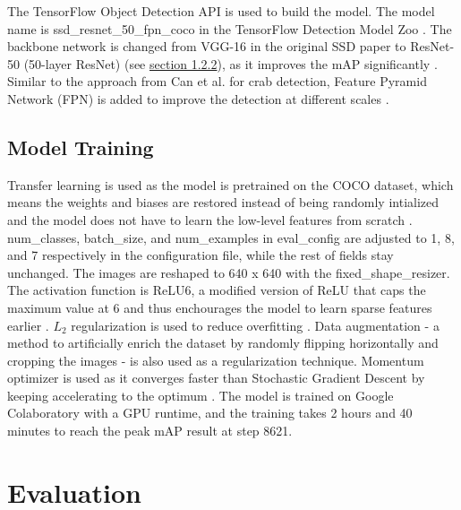 \documentclass[a4paper,11pt,oneside]{article}
\begin{document}
  The TensorFlow Object Detection API \cite{huang2017speed, tfobjectdetection} is used to build the model. The model name
  is ssd\_resnet\_50\_fpn\_coco in the TensorFlow Detection Model Zoo \cite{tfobjectdetectionmodelzoo}. The backbone
  network is changed from VGG-16 in the original SSD paper to ResNet-50 (50-layer ResNet)
  (see \hyperref[sec:122]{section 1.2.2}), as it improves the mAP significantly \cite{he2016deep}. Similar to the approach
  from Can et al. \cite{cao2020real} for crab detection, Feature Pyramid Network (FPN) is added to improve the detection at
  different scales \cite{lin2017feature}.

  \subsection{Model Training}

  Transfer learning \cite{torrey2010transfer} is used as the model is pretrained on the COCO dataset, which means the
  weights and biases are restored instead of being randomly intialized and the model does not have to learn the low-level
  features from scratch \cite{geron2019hands}. num\_classes, batch\_size, and num\_examples in eval\_config are adjusted
  to 1, 8, and 7 respectively in the configuration file, while the rest of fields stay unchanged. The images are reshaped
  to 640 x 640 with the fixed\_shape\_resizer. The activation function is ReLU6, a modified version of ReLU that caps
  the maximum value at 6 and thus enchourages the model to learn sparse features earlier
  \cite{krizhevsky2010convolutional}. $L_2$ regularization \cite{ng2004feature} is used to reduce overfitting
  \cite{hawkins2004problem}. Data augmentation \cite{geron2019hands, krizhevsky2012imagenet} - a method to artificially
  enrich the dataset by randomly flipping horizontally and cropping the images - is also used as a regularization technique.
  Momentum optimizer \cite{polyak1964some} is used as it converges faster than Stochastic Gradient Descent \cite{bottou2010large}
  by keeping accelerating to the optimum \cite{geron2019hands}. The model is trained on Google Colaboratory \cite{colab}
  with a GPU runtime, and the training takes 2 hours and 40 minutes to reach the peak mAP result at step 8621.

  \section{Evaluation}
\end{document}
